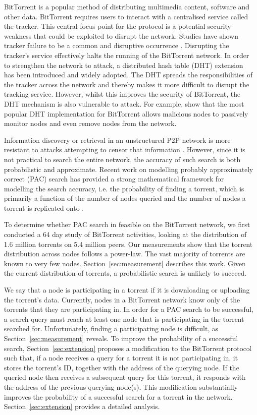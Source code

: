 BitTorrent is a popular method of distributing multimedia content, software and other data. BitTorrent requires users to interact with a centralised service called the tracker. This central focus point for the protocol is a potential security weakness that could be exploited to disrupt the network. Studies have shown tracker failure to be a common and disruptive occurrence \cite{Pouwelse2005}. Disrupting the tracker's service effectively halts the running of the BitTorrent network. In order to strengthen the network to attack, a distributed hash table (DHT) extension has been introduced and widely adopted. The DHT spreads the responsibilities of the tracker across the network and thereby makes it more difficult to disrupt the tracking service. However, whilst this improves the security of BitTorrent, the DHT mechanism is also vulnerable to attack. For example, \cite{Timpanaro2011,Sit2002} show that the most popular DHT implementation for BitTorrent allows malicious nodes to passively monitor nodes and even remove nodes from the network.

Information discovery or retrieval in an unstructured P2P network is more resistant to attacks attempting to censor that information \cite{Lua2005}. However, since it is not practical to search the entire network, the accuracy of such search is both probabilistic and approximate. Recent work on modelling probably approximately correct (PAC) search has provided a strong mathematical framework for modelling the search accuracy, i.e. the probability of finding a torrent, which is primarily a function of the number of nodes queried and the number of nodes a torrent is replicated onto \cite{Asthana2012,Cox,Cox2009}.

To determine whether PAC search in feasible on the BitTorrent network, we first conducted a 64 day study of BitTorrent activities, looking at the distribution of 1.6 million torrents on 5.4 million peers. Our measurements show that the torrent distribution across nodes follows a power-law. The vast majority of torrents are known to very few nodes. Section~\ref{sec:measurement} describes this work. Given the current distribution of torrents, a probabilistic search is unlikely to succeed.

We say that a node is participating in a torrent if it is downloading or uploading the torrent's data. Currently, nodes in a BitTorrent network know only of the torrents that they are participating in. In order for a PAC search to be successful, a search query must reach at least one node that is participating in the torrent searched for. Unfortunately, finding a participating node is difficult, as Section~\ref{sec:measurement} reveals. To improve the probability of a successful search, Section~\ref{sec:extension} proposes a modification to the BitTorrent protocol such that, if a node receives a query for a torrent it is not participating in, it stores the torrent's ID, together with the address of the querying node.  If the queried node then receives a subsequent query for this torrent, it responds with the address of the previous querying node(s). This modification substantially improves the probability of a successful search for a torrent in the network. Section~\ref{sec:extension} provides a detailed analysis.

